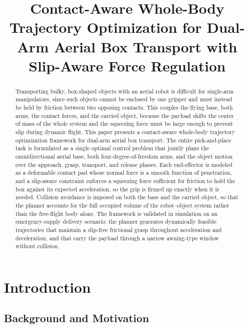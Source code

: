 \documentclass[letterpaper, 10 pt, conference]{ieeeconf}  %
\title{\LARGE \bf
Contact-Aware Whole-Body Trajectory Optimization for Dual-Arm Aerial Box Transport with Slip-Aware Force Regulation
}
\begin{document}
\maketitle
\thispagestyle{empty}
\pagestyle{empty}


\begin{abstract}

Transporting bulky, box-shaped objects with an aerial robot is difficult for single-arm manipulators, since such objects cannot be enclosed by one gripper and must instead be held by friction between two opposing contacts. This couples the flying base, both arms, the contact forces, and the carried object, because the payload shifts the center of mass of the whole system and the squeezing force must be large enough to prevent slip during dynamic flight. This paper presents a contact-aware whole-body trajectory optimization framework for dual-arm aerial box transport. The entire pick-and-place task is formulated as a single optimal control problem that jointly plans the omnidirectional aerial base, both four-degree-of-freedom arms, and the object motion over the approach, grasp, transport, and release phases. Each end-effector is modeled as a deformable contact pad whose normal force is a smooth function of penetration, and a slip-aware constraint enforces a squeezing force sufficient for friction to hold the box against its expected acceleration, so the grip is firmed up exactly when it is needed. Collision avoidance is imposed on both the base and the carried object, so that the planner accounts for the full occupied volume of the robot--object system rather than the free-flight body alone. The framework is validated in simulation on an emergency-supply delivery scenario: the planner generates dynamically feasible trajectories that maintain a slip-free frictional grasp throughout acceleration and deceleration, and that carry the payload through a narrow awning-type window without collision.

\end{abstract}


\section{Introduction}

\subsection{Background and Motivation}
\end{document}
